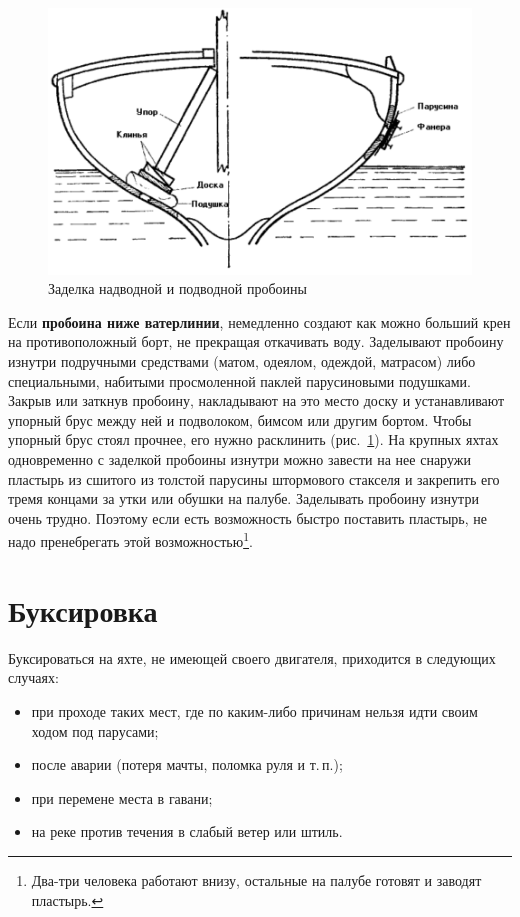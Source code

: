 \documentclass[a4paper, 12pt, twoside, final]{scrbook}
\begin{document}
\begin{figure}[htbp]
   \centering
   \includegraphics{pics/136_Zadelka_proboin} %
   \caption{Заделка надводной и подводной пробоины}
   \label{fig:136}
\end{figure}

Если \textbf{пробоина ниже ватерлинии}, немедленно создают как можно больший крен на противоположный борт, не прекращая откачивать воду. Заделывают пробоину изнутри подручными средствами (матом, одеялом, одеждой, матрасом) либо специальными, набитыми просмоленной паклей парусиновыми подушками. Закрыв или заткнув пробоину, накладывают на это место доску и устанавливают упорный брус между ней и подволоком, бимсом или другим бортом. Чтобы упорный брус стоял прочнее, его нужно расклинить (рис.~\ref{fig:136}). На крупных яхтах одновременно с заделкой пробоины изнутри можно завести на нее снаружи пластырь из сшитого из толстой парусины штормового стакселя и закрепить его тремя концами за утки или обушки на палубе. Заделывать пробоину изнутри очень трудно. Поэтому если есть возможность быстро поставить пластырь, не надо пренебрегать этой возможностью\footnote{Два\--три человека работают внизу, остальные на палубе готовят и заводят пластырь.}.

\section{Буксировка}

Буксироваться на яхте, не имеющей своего двигателя, приходится в следующих случаях:

\begin{itemize}
\item при проходе таких мест, где по каким-либо причинам нельзя идти своим ходом под парусами;
\item после аварии (потеря мачты, поломка руля и т.\,п.);
\item при перемене места в гавани;
\item на реке против течения в слабый ветер или штиль.
\end{itemize}
\end{document}
